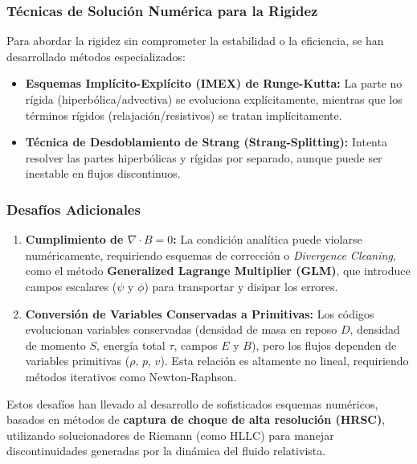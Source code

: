 \subsubsection{Técnicas de Solución Numérica para la Rigidez}

Para abordar la rigidez sin comprometer la estabilidad o la eficiencia, se han desarrollado métodos especializados:

\begin{itemize}
    \item \textbf{Esquemas Implícito-Explícito (IMEX) de Runge-Kutta:} La parte no rígida (hiperbólica/advectiva) se evoluciona explícitamente, mientras que los términos rígidos (relajación/resistivos) se tratan implícitamente.
    \item \textbf{Técnica de Desdoblamiento de Strang (Strang-Splitting):} Intenta resolver las partes hiperbólicas y rígidas por separado, aunque puede ser inestable en flujos discontinuos.
\end{itemize}

\subsubsection{Desafíos Adicionales}

\begin{enumerate}
    \item \textbf{Cumplimiento de $\nabla \cdot B = 0$:} La condición analítica puede violarse numéricamente, requiriendo esquemas de corrección o \emph{Divergence Cleaning}, como el método \textbf{Generalized Lagrange Multiplier (GLM)}, que introduce campos escalares ($\psi$ y $\phi$) para transportar y disipar los errores.
    \item \textbf{Conversión de Variables Conservadas a Primitivas:} Los códigos evolucionan variables conservadas (densidad de masa en reposo $D$, densidad de momento $S$, energía total $\tau$, campos $E$ y $B$), pero los flujos dependen de variables primitivas ($\rho$, $p$, $v$). Esta relación es altamente no lineal, requiriendo métodos iterativos como Newton-Raphson.
\end{enumerate}

Estos desafíos han llevado al desarrollo de sofisticados esquemas numéricos, basados en métodos de \textbf{captura de choque de alta resolución (HRSC)}, utilizando solucionadores de Riemann (como HLLC) para manejar discontinuidades generadas por la dinámica del fluido relativista.
